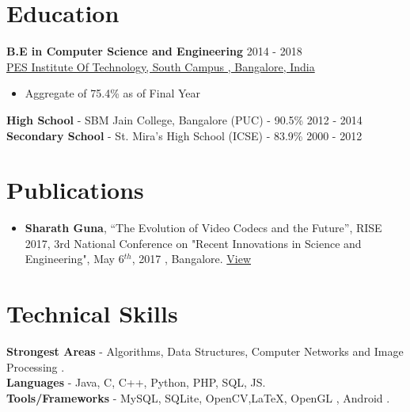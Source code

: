 \documentclass[margin, centered]{res}
\begin{document}
\begin{resume}

\section{Education}
\textbf{B.E in Computer Science and Engineering } \hfill 2014 - 2018 \\
\href{http://pesitsouth.pes.edu/}{  PES Institute Of Technology, South Campus , Bangalore, India}
\begin{itemize}
 \item Aggregate of 75.4\% as of Final Year
\end{itemize}
\textbf{High School} - {SBM Jain College, Bangalore} (PUC) - 90.5\% \hfill 2012 - 2014 \\
\textbf{Secondary School} - St. Mira's High School (ICSE) - 83.9\% \hfill 2000 - 2012


\section{Publications}
\begin{itemize}[leftmargin=*]
\item  \textbf{Sharath Guna}, ``The Evolution of Video Codecs and the Future'', RISE 2017, 3rd National Conference on "Recent Innovations in Science and Engineering", May 6$^{th}$, 2017 , Bangalore. \href{https://www.ijsr.net/conf/RISE2017/IJSR10.pdf}{View}
\end{itemize}


\section{Technical \hspace{2mm} Skills}
\textbf{Strongest Areas} - Algorithms, Data Structures, Computer Networks and Image Processing . \\
\textbf{Languages} - Java, C, C++, Python, PHP, SQL, JS.\\
\textbf{Tools/Frameworks} - MySQL, SQLite, OpenCV,\LaTeX, OpenGL , Android .



\end{resume}
\end{document}
